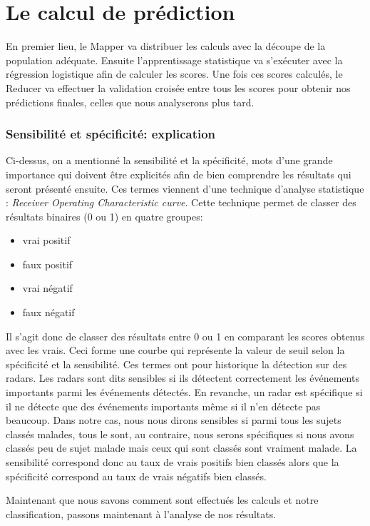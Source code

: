 \section{Le calcul de prédiction}


En premier lieu, le Mapper va distribuer les calculs avec la découpe de la population adéquate.
Ensuite l'apprentissage statistique va s'exécuter avec la régression logistique afin de calculer les scores. 
Une fois ces scores calculés, le Reducer va effectuer la validation croisée entre tous les scores pour obtenir nos prédictions finales, celles que nous analyserons plus tard. 

\subsubsection{Sensibilité et spécificité: explication}

Ci-dessus, on a mentionné la sensibilité et la spécificité, mots d'une grande importance qui doivent être explicités afin de bien comprendre les résultats qui seront présenté ensuite. 
Ces termes viennent d'une technique d'analyse statistique : \textit{Receiver Operating Characteristic curve}. Cette technique  permet de classer des résultats binaires (0 ou 1) en quatre groupes: 
\begin{itemize}
	\item vrai positif
	\item faux positif
	\item vrai négatif
	\item faux négatif
\end{itemize}

Il s'agit donc de classer des résultats entre 0 ou 1 en comparant les scores obtenus avec les vrais. Ceci forme une courbe qui représente la valeur de seuil selon la spécificité et la sensibilité. 
Ces termes ont pour historique la détection sur des radars. Les radars sont dits sensibles si ils détectent correctement les événements importants parmi les événements détectés. En revanche, un radar est spécifique si il ne détecte que des événements importants même si il n'en détecte pas beaucoup.  
Dans notre cas, nous nous dirons sensibles si parmi tous les sujets classés malades, tous le sont, au contraire, nous serons spécifiques si nous avons classés peu de sujet malade mais ceux qui sont classés sont vraiment malade.
La sensibilité correspond donc au taux de vrais positifs bien classés alors que la spécificité correspond au taux de vrais négatifs bien classés.  


Maintenant que nous savons comment sont effectués les calculs et notre classification, passons maintenant à l'analyse de nos résultats. 
